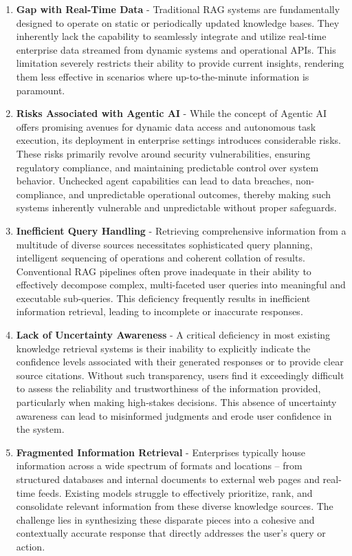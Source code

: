 \documentclass[default]{sn-jnl}%
\begin{document}
\begin{enumerate}
    \item \textbf{Gap with Real-Time Data} - Traditional RAG systems are fundamentally designed to operate on static or periodically updated knowledge bases. They inherently lack the capability to seamlessly integrate and utilize real-time enterprise data streamed from dynamic systems and operational APIs. This limitation severely restricts their ability to provide current insights, rendering them less effective in scenarios where up-to-the-minute information is paramount.
    \item \textbf{Risks Associated with Agentic AI} - While the concept of Agentic AI offers promising avenues for dynamic data access and autonomous task execution, its deployment in enterprise settings introduces considerable risks. These risks primarily revolve around security vulnerabilities, ensuring regulatory compliance, and maintaining predictable control over system behavior. Unchecked agent capabilities can lead to data breaches, non-compliance, and unpredictable operational outcomes, thereby making such systems inherently vulnerable and unpredictable without proper safeguards.
    \item \textbf{Inefficient Query Handling} - Retrieving comprehensive information from a multitude of diverse sources necessitates sophisticated query planning, intelligent sequencing of operations and coherent collation of results. Conventional RAG pipelines often prove inadequate in their ability to effectively decompose complex, multi-faceted user queries into meaningful and executable sub-queries. This deficiency frequently results in inefficient information retrieval, leading to incomplete or inaccurate responses.
    \item \textbf{Lack of Uncertainty Awareness} - A critical deficiency in most existing knowledge retrieval systems is their inability to explicitly indicate the confidence levels associated with their generated responses or to provide clear source citations. Without such transparency, users find it exceedingly difficult to assess the reliability and trustworthiness of the information provided, particularly when making high-stakes decisions. This absence of uncertainty awareness can lead to misinformed judgments and erode user confidence in the system.
    \item \textbf{Fragmented Information Retrieval} - Enterprises typically house information across a wide spectrum of formats and locations – from structured databases and internal documents to external web pages and real-time feeds. Existing models struggle to effectively prioritize, rank, and consolidate relevant information from these diverse knowledge sources. The challenge lies in synthesizing these disparate pieces into a cohesive and contextually accurate response that directly addresses the user's query or action.

\end{enumerate}
\end{document}
